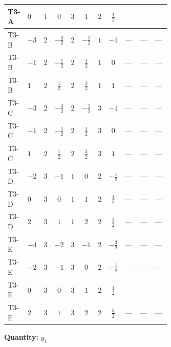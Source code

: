 \documentclass[8pt]{article}
\begin{document}
\begin{landscape}
\begin{longtable}{@{}llcccccc >{\raggedright\arraybackslash}p{0.21\linewidth} >{\raggedright\arraybackslash}p{0.21\linewidth} >{\raggedright\arraybackslash}p{0.21\linewidth}@{}}
\midrule
T3-A & $0$ & $1$ & $0$ & $3$ & $1$ & $2$ & $\frac{1}{2}$ & \scriptsize\adjustbox{max width=\linewidth}{$\begin{gathered} 2 T_{\nu}^{(1)} \left({y_1}\right)_{ij}\end{gathered}$} & \scriptsize\adjustbox{max width=\linewidth}{$\begin{gathered} +\frac{3}{4} \left({y_2}\,\left({y_2}\right)^{\dagger}\,{y_1}\right)_{ij}\end{gathered}$} & \scriptsize\adjustbox{max width=\linewidth}{$\begin{gathered} +\frac{1}{2} \left({Y_e}\,\left({Y_e}\right)^{\dagger}\,{y_1}\right)_{ij}\end{gathered}$} \\
\midrule
T3-B & $-3$ & $2$ & $-\frac{3}{2}$ & $2$ & $-\frac{1}{2}$ & $1$ & $-1$ & --- & --- & --- \\
\midrule
T3-B & $-1$ & $2$ & $-\frac{1}{2}$ & $2$ & $\frac{1}{2}$ & $1$ & $0$ & --- & --- & --- \\
\midrule
T3-B & $1$ & $2$ & $\frac{1}{2}$ & $2$ & $\frac{3}{2}$ & $1$ & $1$ & --- & --- & --- \\
\midrule
T3-C & $-3$ & $2$ & $-\frac{3}{2}$ & $2$ & $-\frac{1}{2}$ & $3$ & $-1$ & --- & --- & --- \\
\midrule
T3-C & $-1$ & $2$ & $-\frac{1}{2}$ & $2$ & $\frac{1}{2}$ & $3$ & $0$ & --- & --- & --- \\
\midrule
T3-C & $1$ & $2$ & $\frac{1}{2}$ & $2$ & $\frac{3}{2}$ & $3$ & $1$ & --- & --- & --- \\
\midrule
T3-D & $-2$ & $3$ & $-1$ & $1$ & $0$ & $2$ & $-\frac{1}{2}$ & --- & --- & --- \\
\midrule
T3-D & $0$ & $3$ & $0$ & $1$ & $1$ & $2$ & $\frac{1}{2}$ & --- & --- & --- \\
\midrule
T3-D & $2$ & $3$ & $1$ & $1$ & $2$ & $2$ & $\frac{3}{2}$ & --- & --- & --- \\
\midrule
T3-E & $-4$ & $3$ & $-2$ & $3$ & $-1$ & $2$ & $-\frac{3}{2}$ & --- & --- & --- \\
\midrule
T3-E & $-2$ & $3$ & $-1$ & $3$ & $0$ & $2$ & $-\frac{1}{2}$ & --- & --- & --- \\
\midrule
T3-E & $0$ & $3$ & $0$ & $3$ & $1$ & $2$ & $\frac{1}{2}$ & --- & --- & --- \\
\midrule
T3-E & $2$ & $3$ & $1$ & $3$ & $2$ & $2$ & $\frac{3}{2}$ & --- & --- & --- \\
\midrule
\bottomrule
\end{longtable}
\clearpage
\noindent\textbf{Quantity: }$y_1$\par\smallskip

\end{landscape}
\end{document}
